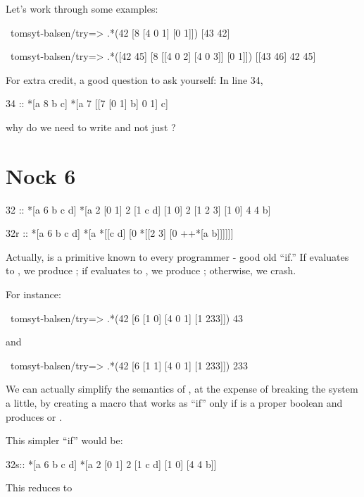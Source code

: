 Let's work through some examples:

\begin{code}
~tomsyt-balsen/try=> .*(42 [8 [4 0 1] [0 1]])
[43 42]

~tomsyt-balsen/try=> .*([42 45] [8 [[4 0 2] [4 0 3]] [0 1]])
[[43 46] 42 45]
\end{code}
For extra credit, a good question to ask yourself: In line 34,

\begin{code}
    34 ::    *[a 8 b c]       *[a 7 [[7 [0 1] b] 0 1] c]
\end{code}
why do we need to write \kode{[7 [0 1] b]} and not just ?

\section{Nock 6}

\begin{code}
32 ::    *[a 6 b c d]     *[a 2 [0 1] 2 [1 c d] [1 0] 2 [1 2 3] [1 0] 4 4 b]

32r ::    *[a 6 b c d]     *[a *[[c d] [0 *[[2 3] [0 ++*[a b]]]]]]
\end{code}

Actually,  is a primitive known to every programmer - good old
``if.''  If  evaluates to , we produce ; if  evaluates
to , we produce ; otherwise, we crash.

For instance:

\begin{code}
~tomsyt-balsen/try=> .*(42 [6 [1 0] [4 0 1] [1 233]])
43
\end{code}
and

\begin{code}
~tomsyt-balsen/try=> .*(42 [6 [1 1] [4 0 1] [1 233]])
233
\end{code}

We can actually simplify the semantics of , at the expense of
breaking the system a little, by creating a macro that works as
``if'' only if  is a proper boolean and produces  or .

This simpler ``if'' would be:

\begin{code}
32s::    *[a 6 b c d]    *[a 2 [0 1] 2 [1 c d] [1 0] [4 4 b]]
\end{code}
This reduces to

